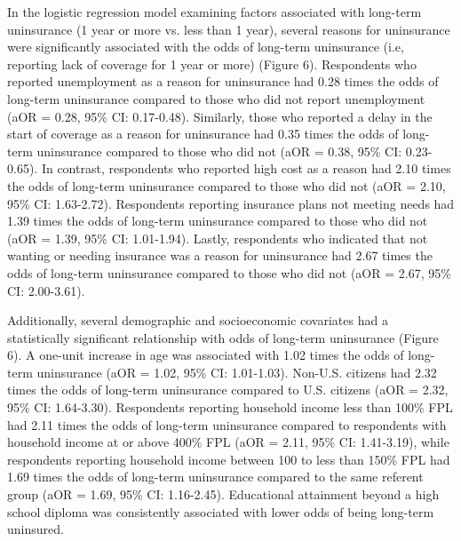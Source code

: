 \documentclass[12pt]{article}
\begin{document}
In the logistic regression model examining factors associated with long-term uninsurance (1 year or more vs. less than 1 year), several reasons for uninsurance were significantly associated with the odds of long-term uninsurance (i.e, reporting lack of coverage for 1 year or more) (Figure 6). Respondents who reported unemployment as a reason for uninsurance had 0.28 times the odds of long-term uninsurance compared to those who did not report unemployment (aOR = 0.28, 95\% CI: 0.17-0.48). Similarly, those who reported a delay in the start of coverage as a reason for uninsurance had 0.35 times the odds of long-term uninsurance compared to those who did not (aOR = 0.38, 95\% CI: 0.23-0.65). In contrast, respondents who reported high cost as a reason had 2.10 times the odds of long-term uninsurance compared to those who did not (aOR = 2.10, 95\% CI: 1.63-2.72). Respondents reporting insurance plans not meeting needs had 1.39 times the odds of long-term uninsurance compared to those who did not (aOR = 1.39, 95\% CI: 1.01-1.94). Lastly, respondents who indicated that not wanting or needing insurance was a reason for uninsurance had 2.67 times the odds of long-term uninsurance compared to those who did not (aOR = 2.67, 95\% CI: 2.00-3.61).

Additionally, several demographic and socioeconomic covariates had a statistically significant relationship with odds of long-term uninsurance (Figure 6). A one-unit increase in age was associated with 1.02 times the odds of long-term uninsurance (aOR = 1.02, 95\% CI: 1.01-1.03). Non-U.S. citizens had 2.32 times the odds of long-term uninsurance compared to U.S. citizens (aOR = 2.32, 95\% CI: 1.64-3.30). Respondents reporting household income less than 100\% FPL had 2.11 times the odds of long-term uninsurance compared to respondents with household income at or above 400\% FPL (aOR = 2.11, 95\% CI: 1.41-3.19), while respondents reporting household income between 100 to less than 150\% FPL had 1.69 times the odds of long-term uninsurance compared to the same referent group (aOR = 1.69, 95\% CI: 1.16-2.45). Educational attainment beyond a high school diploma was consistently associated with lower odds of being long-term uninsured.


\newpage
\end{document}
